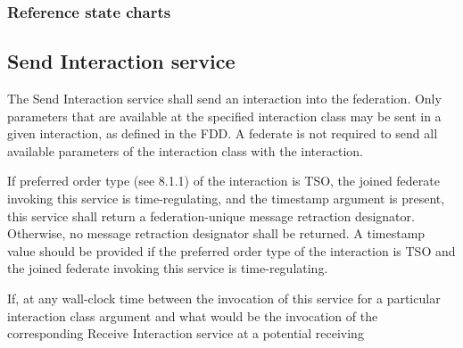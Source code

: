 \begin{compactstdpage}

    \subsubsection{Reference state charts}



    \subsection{Send Interaction service}


    The Send Interaction service shall send an interaction into the federation. Only parameters that are available at the specified interaction class may be sent in a given interaction, as defined in the FDD. A federate is not required to send all available parameters of the interaction class with the interaction.


    If preferred order type (see 8.1.1) of the interaction is TSO, the joined federate invoking this service is time-regulating, and the timestamp argument is present, this service shall return a federation-unique message retraction designator. Otherwise, no message retraction designator shall be returned. A timestamp value should be provided if the preferred order type of the interaction is TSO and the joined federate invoking this service is time-regulating.


    If, at any wall-clock time between the invocation of this service for a particular interaction class argument and what would be the invocation of the corresponding Receive Interaction \rtiinitiated{} service at a potential receiving

\end{compactstdpage}

\clearpage

